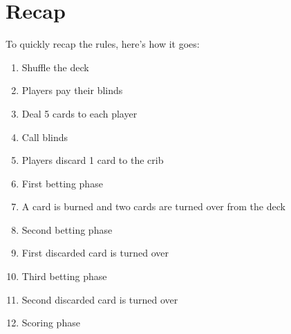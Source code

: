 \section{Recap}

To quickly recap the rules, here's how it goes:

\begin{enumerate}
    \item Shuffle the deck
    \item Players pay their blinds
    \item Deal 5 cards to each player
    \item Call blinds
    \item Players discard 1 card to the crib
    \item First betting phase
    \item A card is burned and two cards are turned over from the deck
    \item Second betting phase
    \item First discarded card is turned over
    \item Third betting phase
    \item Second discarded card is turned over
    \item Scoring phase
\end{enumerate}